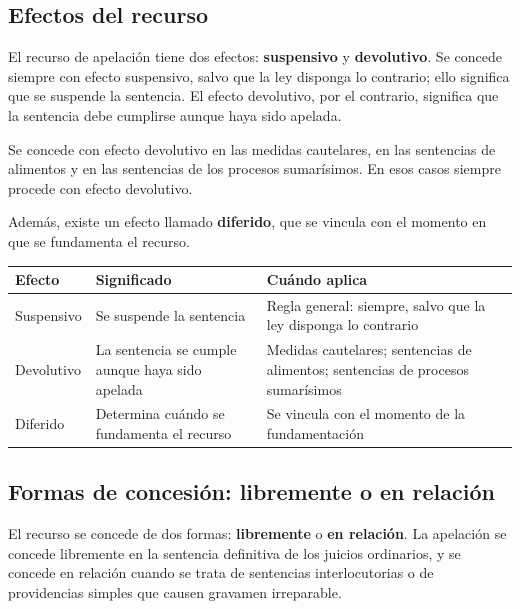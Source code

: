 \documentclass[12pt,oneside]{book}
\begin{document}
\subsection{Efectos del recurso}

El recurso de apelaci\'on tiene dos efectos: \textbf{suspensivo} y \textbf{devolutivo}. Se concede siempre con efecto suspensivo, salvo que la ley disponga lo contrario; ello significa que se suspende la sentencia. El efecto devolutivo, por el contrario, significa que la sentencia debe cumplirse aunque haya sido apelada.

Se concede con efecto devolutivo en las medidas cautelares, en las sentencias de alimentos y en las sentencias de los procesos sumar\'isimos. En esos casos siempre procede con efecto devolutivo.

Adem\'as, existe un efecto llamado \textbf{diferido}, que se vincula con el momento en que se fundamenta el recurso.


\begin{table}[H]
\centering
\renewcommand{\arraystretch}{1.3}
\begin{tabularx}{\textwidth}{
    >{\raggedright\arraybackslash}p{}
    >{\raggedright\arraybackslash}X
    >{\raggedright\arraybackslash}X
}
\toprule
\textbf{Efecto} & \textbf{Significado} & \textbf{Cu\'ando aplica} \\
\midrule
Suspensivo & Se suspende la sentencia & Regla general: siempre, salvo que la ley disponga lo contrario \\
Devolutivo & La sentencia se cumple aunque haya sido apelada & Medidas cautelares; sentencias de alimentos; sentencias de procesos sumar\'isimos \\
Diferido & Determina cu\'ando se fundamenta el recurso & Se vincula con el momento de la fundamentaci\'on \\
\bottomrule
\end{tabularx}
\end{table}

\subsection{Formas de concesi\'on: libremente o en relaci\'on}

El recurso se concede de dos formas: \textbf{libremente} o \textbf{en relaci\'on}. La apelaci\'on se concede libremente en la sentencia definitiva de los juicios ordinarios, y se concede en relaci\'on cuando se trata de sentencias interlocutorias o de providencias simples que causen gravamen irreparable.
\end{document}
